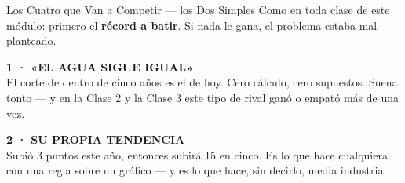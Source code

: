\documentclass[aspectratio=169, 11pt]{beamer}
\begin{document}
\begin{frame}[shrink=20]{Los Cuatro que Van a Competir --- los Dos Simples}
  \vspace{3pt}
  {\footnotesize\color{textMuted}
   Como en toda clase de este módulo: primero el \textbf{récord a batir}. Si
   nada le gana, el problema estaba mal planteado.}
  \vspace{3pt}
  \begin{tcolorbox}[colback=arcaGray, colframe=textMuted, boxrule=0pt,
    leftrule=3pt, arc=3pt, left=9pt, right=9pt, top=4pt, bottom=4pt]
    {\scriptsize\color{arcaDark}\bfseries 1 · «EL AGUA SIGUE IGUAL»}\\[4pt]
    {\footnotesize\color{textMuted}
     El corte de dentro de cinco años es el de hoy. Cero cálculo, cero
     supuestos. Suena tonto --- y en la Clase 2 y la Clase 3 este tipo de
     rival ganó o empató más de una vez.}
  \end{tcolorbox}
  \vspace{3pt}
  \begin{tcolorbox}[colback=arcaGray, colframe=textMuted, boxrule=0pt,
    leftrule=3pt, arc=3pt, left=9pt, right=9pt, top=4pt, bottom=4pt]
    {\scriptsize\color{arcaDark}\bfseries 2 · SU PROPIA TENDENCIA}\\[4pt]
    {\footnotesize\color{textMuted}
     Subió 3 puntos este año, entonces subirá 15 en cinco. Es lo que hace
     cualquiera con una regla sobre un gráfico --- y es lo que hace, sin
     decirlo, media industria.}
  \end{tcolorbox}
\end{frame}
\end{document}
